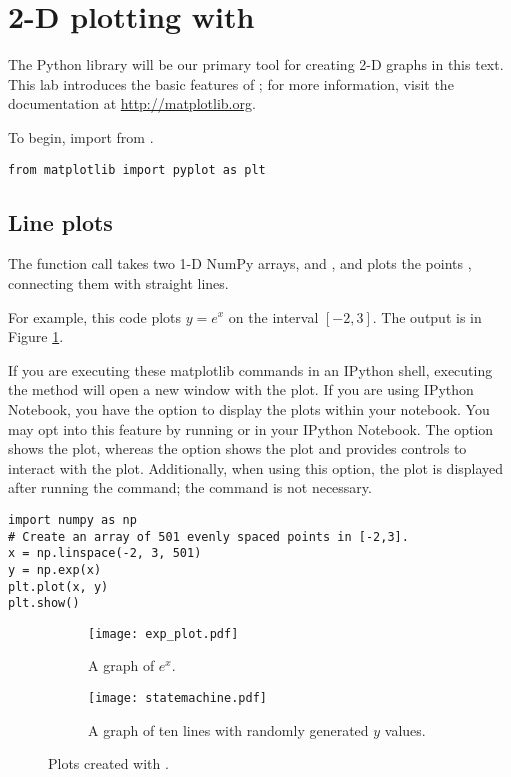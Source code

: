 \label{lab:Matplotlib_and_Mayavi}

\section*{2-D plotting with }
The Python library  will be our primary tool for creating 2-D graphs in this text. This lab introduces the basic features of ; for more information, visit the documentation at \url{http://matplotlib.org}.

To begin, import  from .
\begin{lstlisting}
from matplotlib import pyplot as plt
\end{lstlisting}

\subsection*{Line plots}
The function call  takes two 1-D NumPy arrays,  and , and plots the points , connecting them with straight lines.

For example, this code plots $y=e^x$ on the interval $[-2,3]$. The output is in Figure \ref{fig:exp_plot}.

\begin{info}
If you are executing these matplotlib commands in an IPython shell, executing the  method will open a new window with the plot. If you are using IPython Notebook, you have the option to display the plots within your notebook. You may opt into this feature by running  or  in your IPython Notebook. The  option shows the plot, whereas the  option shows the plot and provides controls to interact with the plot. Additionally, when using this option, the plot is displayed after running the  command; the  command is not necessary. 
\end{info}

\begin{lstlisting}
import numpy as np
# Create an array of 501 evenly spaced points in [-2,3].
x = np.linspace(-2, 3, 501)
y = np.exp(x)
plt.plot(x, y)
plt.show()
\end{lstlisting}

\begin{figure}
\centering
\begin{subfigure}[t]{.49\textwidth}
\centering
\texttt{[image: exp\_plot.pdf]}
\caption{A graph of $e^x$.}
\label{fig:exp_plot}
\end{subfigure}
\begin{subfigure}[t]{.49\textwidth}
\centering
\texttt{[image: statemachine.pdf]}
\caption{A graph of ten lines with randomly generated $y$ values.}
\label{fig:statemachine}
\end{subfigure}
\caption{Plots created with .}
\label{fig:lineplots}
\end{figure}

